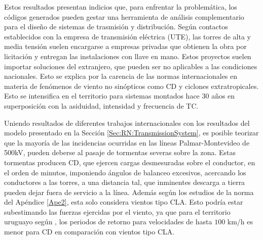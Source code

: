Estos resultados presentan indicios que, para enfrentar la problemática, los códigos generados pueden gestar una herramienta de análisis complementario para el diseño de sistemas de trasmisión y distribución. Según contactos establecidos con la empresa de transmisión eléctrica (UTE), las torres de alta y media tensión suelen encargarse a empresas privadas que obtienen la obra por licitación y entregan las instalaciones con llave en mano. Estos proyectos suelen importar soluciones del extranjero, que pueden ser no aplicables a las condiciones nacionales. Esto se explica por la carencia de las normas internacionales en materia de fenómenos de viento no sinópticos como CD y ciclones extratropicales. Esto se intensifica en el territorio para sistemas montados hace 30 años en superposición con la asiduidad, intensidad y frecuencia de TC. 

Uniendo resultados de diferentes trabajos internacionales con los resultados del modelo presentado en la Sección \ref{Sec:RN:TransmissionSystem}, es posible teorizar que la mayoría de las incidencias ocurridas en las líneas Palmar-Montevideo de 500kV, pueden deberse al pasaje de tormentas severas sobre la zona. Estas tormentas producen CD, que ejercen cargas desmesuradas sobre el conductor, en el orden de minutos, imponiendo ángulos de balanceo excesivos, acercando los conductores a las torres, a una distancia tal, que inminentes descarga a tierra pueden dejar fuera de servicio a la línea. Además según los estudios de la norma \cite{IEC60826} del Apéndice \ref{Ape2}, esta solo considera vientos tipo CLA. Esto podría estar subestimando las fuerzas ejercidas por el viento, ya que para el territorio uruguayo según \cite{Duranona2018}, los periodos de retorno para velocidades de hasta $100$ km/h es menor para CD en comparación con vientos tipo CLA. 




